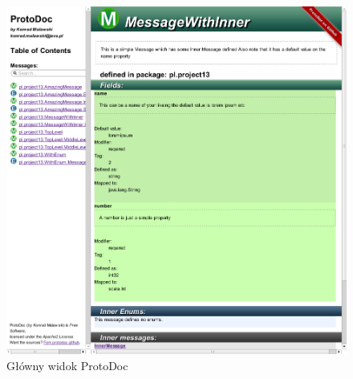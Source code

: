 \documentclass[a4paper]{article}
\begin{document}
\begin{figure}[ch!]
 \centering
 \includegraphics[width=35em]{protodoc_main}
 \caption{Główny widok ProtoDoc}
 \label{fig:protodoc_main}
\end{figure}
\end{document}

